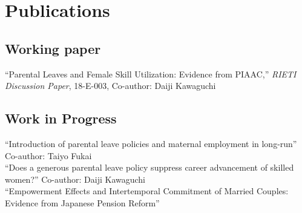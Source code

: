 \documentclass[11pt, a4paper]{article} %
\newcommand{\years}[1]{\marginnote{\scriptsize #1}} %
\begin{document}

\section*{Publications}







\subsection*{Working paper}

\years{2018} ``Parental Leaves and Female Skill Utilization: Evidence from PIAAC,'' \textit{RIETI Discussion Paper}, 18-E-003, Co-author: Daiji Kawaguchi



\subsection*{Work in Progress}

\years{} ``Introduction of parental leave policies and maternal employment in long-run'' Co-author: Taiyo Fukai \\
\years{} ``Does a generous parental leave policy suppress career advancement of skilled women?'' Co-author: Daiji Kawaguchi \\
\years{} ``Empowerment Effects and Intertemporal Commitment of Married Couples: Evidence from Japanese Pension Reform''
\end{document}
